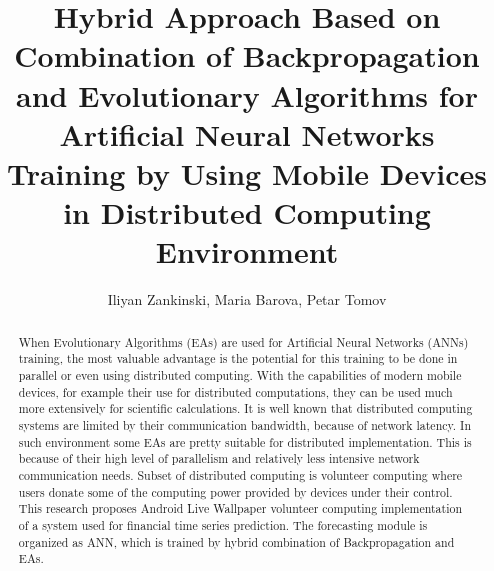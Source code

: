 \documentclass{llncs}
\begin{document}
\pagestyle{headings} 
\mainmatter
%
\title{Hybrid Approach Based on Combination of Backpropagation and Evolutionary Algorithms for Artificial Neural Networks Training by Using Mobile Devices in Distributed Computing Environment}
%
\author{Iliyan Zankinski, Maria Barova, Petar Tomov}
%
%
%
%
%
\maketitle
%
\begin{abstract}
When Evolutionary Algorithms (EAs) are used for Artificial Neural Networks (ANNs) training, the most valuable advantage is the potential for this training to be done in parallel or even using distributed computing. With the capabilities of modern mobile devices, for example their use for distributed computations, they can be used much more extensively for scientific calculations. It is well known that distributed computing systems are limited by their communication bandwidth, because of network latency. In such environment some EAs are pretty suitable for distributed implementation. This is because of their high level of parallelism and relatively less intensive network communication needs. Subset of distributed computing is volunteer computing where users donate some of the computing power provided by devices under their control. This research proposes Android Live Wallpaper volunteer computing implementation of a system used for financial time series prediction. The forecasting module is organized as ANN, which is trained by hybrid combination of Backpropagation and EAs. 
\end{abstract}
%
\end{document}
